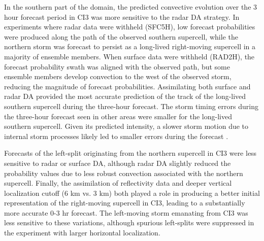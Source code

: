 In the southern part of the domain, the predicted convective evolution over the 3 hour forecast period in CI3 was more sensitive to the radar DA strategy. In experiments where radar data were withheld (SFC5H), low forecast probabilities were produced along the path of the observed southern supercell, while the northern storm was forecast to persist as a long-lived right-moving supercell in a majority of ensemble members. When surface data were withheld (RAD2H), the forecast probability swath was aligned with the observed path, but some ensemble members develop convection to the west of the observed storm, reducing the magnitude of forecast probabilities. Assimilating both surface and radar DA provided the most accurate prediction of the track of the long-lived southern supercell during the three-hour forecast. The storm timing errors during the three-hour forecast seen in other areas were smaller for the long-lived southern supercell. Given its predicted intensity, a slower storm motion due to internal storm processes likely led to smaller errors during the forecast \citep{bunkersetal00}.

Forecasts of the left-split originating from the northern supercell in CI3 were less sensitive to radar or surface DA, although radar DA slightly reduced the probability values due to less robust convection associated with the northern supercell. Finally, the assimilation of reflectivity data and deeper vertical localization cutoff (6 km vs. 3 km) both played a role in producing a better initial representation of the right-moving supercell in CI3, leading to a substantially more accurate 0-3 hr forecast. The left-moving storm emanating from CI3 was less sensitive to these variations, although spurious left-splits were suppressed in the experiment with larger horizontal localization.
